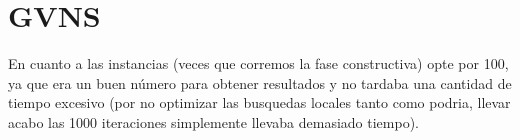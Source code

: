 \section{GVNS}

En cuanto a las instancias (veces que corremos la fase constructiva) opte por 100, ya que era un buen número para obtener resultados y no tardaba una cantidad de tiempo excesivo (por no optimizar las busquedas locales tanto como podria, llevar  acabo las 1000 iteraciones simplemente llevaba demasiado tiempo).